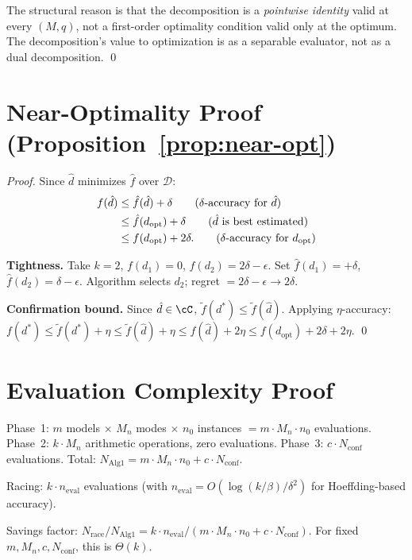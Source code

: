 \documentclass[11pt]{article}
\newtheorem{proof}{Proof}
\newcommand{\cD}{\mathcal{D}}
\newcommand{\Mn}{M_n}
\begin{document}
The structural reason is that the decomposition is a \emph{pointwise
identity} valid at every $(M, q)$, not a first-order optimality condition
valid only at the optimum.  The decomposition's value to optimization is
as a separable evaluator, not as a dual decomposition. \qed

\section{Near-Optimality Proof (Proposition~\ref{prop:near-opt})}
\label{app:near-opt}

\begin{proof}
Since $\hat{d}$ minimizes $\hat{f}$ over $\cD$:
\begin{align}
  f(\hat{d})
  &\le \hat{f}(\hat{d}) + \delta
    \tag{$\delta$-accuracy for $\hat{d}$} \\
  &\le \hat{f}(d_{\mathrm{opt}}) + \delta
    \tag{$\hat{d}$ is best estimated} \\
  &\le f(d_{\mathrm{opt}}) + 2\delta.
    \tag{$\delta$-accuracy for $d_{\mathrm{opt}}$}
\end{align}

\textbf{Tightness.}
Take $k{=}2$, $f(d_1) = 0$, $f(d_2) = 2\delta - \epsilon$.
Set $\hat{f}(d_1) = +\delta$, $\hat{f}(d_2) = \delta - \epsilon$.
Algorithm selects $d_2$; regret $= 2\delta - \epsilon \to 2\delta$.

\textbf{Confirmation bound.}
Since $\hat{d} \in \cC$, $\tilde{f}(d^*) \le \tilde{f}(\hat{d})$.
Applying $\eta$-accuracy:
$f(d^*) \le \tilde{f}(d^*) + \eta \le \tilde{f}(\hat{d}) + \eta
\le f(\hat{d}) + 2\eta \le f(d_{\mathrm{opt}}) + 2\delta + 2\eta$. \qed
\end{proof}

\section{Evaluation Complexity Proof}
\label{app:eval-complexity}

Phase~1: $m$ models $\times$ $\Mn$ modes $\times$ $n_0$ instances
$= m \cdot \Mn \cdot n_0$ evaluations.
Phase~2: $k \cdot \Mn$ arithmetic operations, zero evaluations.
Phase~3: $c \cdot N_{\mathrm{conf}}$ evaluations.
Total: $N_{\mathrm{Alg1}} = m \cdot \Mn \cdot n_0 + c \cdot N_{\mathrm{conf}}$.

Racing: $k \cdot n_{\mathrm{eval}}$ evaluations (with
$n_{\mathrm{eval}} = O(\log(k/\beta)/\delta^2)$ for Hoeffding-based
accuracy).

Savings factor:
$N_{\mathrm{race}}/N_{\mathrm{Alg1}} = k \cdot n_{\mathrm{eval}} /
(m \cdot \Mn \cdot n_0 + c \cdot N_{\mathrm{conf}})$.
For fixed $m, \Mn, c, N_{\mathrm{conf}}$, this is $\Theta(k)$.
\end{document}
